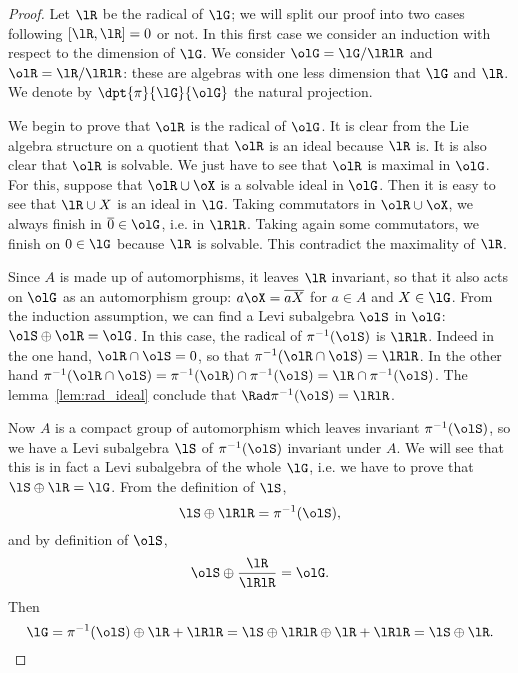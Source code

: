 \begin{proof}
	Let $\lR$ be the radical of $\lG$; we will split our proof into two cases following $[\lR,\lR]=0$ or not.
	In this first case we consider an induction with respect to the dimension of $\lG$. We consider $\olG=\lG/\lRlR$ and $\olR=\lR/\lRlR$: these are algebras with one less dimension that $\lG$ and $\lR$. We denote by $\dpt{\pi}{\lG}{\olG}$ the natural projection.

	We begin to prove that $\olR$ is the radical of $\olG$. It is clear from the Lie algebra structure on a quotient that $\olR$ is an ideal because $\lR$ is. It is also clear that $\olR$ is solvable. We just have to see that $\olR$ is maximal in $\olG$. For this, suppose that $\olR\cup\oX$ is a solvable ideal in $\olG$. Then it is easy to see that $\lR\cup X$ is an ideal in $\lG$. Taking commutators in $\olR\cup\oX$, we always finish in $\overline{0}\in\olG$, i.e. in $\lRlR$. Taking again some commutators, we finish on $0\in\lG$ because $\lR$ is solvable. This contradict the maximality of $\lR$.

	Since $A$ is made up of automorphisms, it leaves $\lR$ invariant, so that it also acts on $\olG$ as an automorphism group: $a\oX=\overline{aX}$ for $a\in A$ and $X\in\lG$. From the induction assumption, we can find a Levi subalgebra $\olS$ in $\olG$: $\olS\oplus\olR=\olG$. In this case, the radical of $\pi^{-1}(\olS)$ is $\lRlR$. Indeed in the one hand, $\olR\cap\olS=0$, so that $\pi^{-1}(\olR\cap\olS)=\lRlR$. In the other hand $\pi^{-1}(\olR\cap\olS)=\pi^{-1}(\olR)\cap\pi^{-1}(\olS)=\lR\cap\pi^{-1}(\olS)$. The lemma~\ref{lem:rad_ideal} conclude that $\Rad\pi^{-1}(\olS)=\lRlR$.

	Now $A$ is a compact group of automorphism which leaves invariant $\pi^{-1}(\olS)$, so we have a Levi subalgebra $\lS$ of $\pi^{-1}(\olS)$ invariant under $A$. We will see that this is in fact a Levi subalgebra of the whole $\lG$, i.e. we have to prove that $\lS\oplus\lR=\lG$. From the definition of $\lS$,
	\[
		\lS\oplus\lRlR=\pi^{-1}(\olS),
	\]
	and by definition of $\olS$,
	\[
		\olS\oplus\frac{\lR}{\lRlR}=\olG.
	\]
	Then
	\begin{equation}
		\lG=\pi^{-1}(\olS)\oplus\lR+\lRlR
		=\lS\oplus\lRlR\oplus\lR+\lRlR
		=\lS\oplus\lR.
	\end{equation}


\end{proof}
